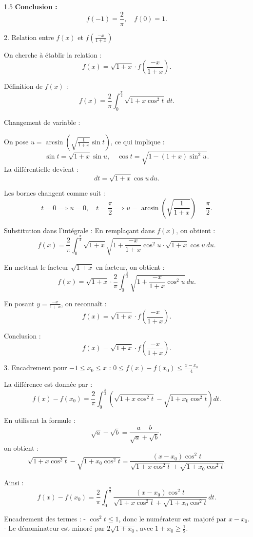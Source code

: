 \documentclass[12pt]{article}
\begin{document}
\begin{spacing}{1.5}
\textbf{ Conclusion :}
\[
f(-1) = \frac{2}{\pi}, \quad f(0) = 1.
\]

2. Relation entre $f(x)$ et $f\left(\frac{-x}{1+x}\right)$

On cherche à établir la relation :
\[
f(x) = \sqrt{1+x} \cdot f\left(\frac{-x}{1+x}\right).
\]

Définition de $f(x)$ :
\[
f(x) = \frac{2}{\pi} \int_{0}^{\frac{\pi}{2}} \sqrt{1 + x \cos^2 t} \, dt.
\]

Changement de variable :

On pose $u = \arcsin\left(\sqrt{\frac{1}{1+x}} \sin t\right)$, ce qui implique :
\[
\sin t = \sqrt{1+x} \sin u, \quad \cos t = \sqrt{1 - (1+x)\sin^2 u}.
\]
La différentielle devient :
\[
dt = \sqrt{1+x} \cos u \, du.
\]

Les bornes changent comme suit :  
\[
t = 0 \implies u = 0, \quad t = \frac{\pi}{2} \implies u = \arcsin\left(\sqrt{\frac{1}{1+x}}\right) = \frac{\pi}{2}.
\]

Substitution dans l'intégrale :
En remplaçant dans $f(x)$, on obtient :
\[
f(x) = \frac{2}{\pi} \int_{0}^{\frac{\pi}{2}} \sqrt{1+x} \sqrt{1 + \frac{-x}{1+x} \cos^2 u} \cdot \sqrt{1+x} \cos u \, du.
\]

En mettant le facteur $\sqrt{1+x}$ en facteur, on obtient :
\[
f(x) = \sqrt{1+x} \cdot \frac{2}{\pi} \int_{0}^{\frac{\pi}{2}} \sqrt{1 + \frac{-x}{1+x} \cos^2 u} \, du.
\]

En posant $y = \frac{-x}{1+x}$, on reconnaît :
\[
f(x) = \sqrt{1+x} \cdot f\left(\frac{-x}{1+x}\right).
\]

Conclusion :
\[
f(x) = \sqrt{1+x} \cdot f\left(\frac{-x}{1+x}\right).
\]

3. Encadrement pour $-1 \leq x_0 \leq x$ : $0 \leq f(x) - f(x_0) \leq \frac{x - x_0}{4}$

La différence est donnée par :
\[
f(x) - f(x_0) = \frac{2}{\pi} \int_{0}^{\frac{\pi}{2}} \left( \sqrt{1 + x \cos^2 t} - \sqrt{1 + x_0 \cos^2 t} \right) dt.
\]

En utilisant la formule :
\[
\sqrt{a} - \sqrt{b} = \frac{a - b}{\sqrt{a} + \sqrt{b}},
\]
on obtient :
\[
\sqrt{1 + x \cos^2 t} - \sqrt{1 + x_0 \cos^2 t} = \frac{(x - x_0) \cos^2 t}{\sqrt{1 + x \cos^2 t} + \sqrt{1 + x_0 \cos^2 t}}.
\]

Ainsi :
\[
f(x) - f(x_0) = \frac{2}{\pi} \int_{0}^{\frac{\pi}{2}} \frac{(x - x_0) \cos^2 t}{\sqrt{1 + x \cos^2 t} + \sqrt{1 + x_0 \cos^2 t}} \, dt.
\]

Encadrement des termes :
- \( \cos^2 t \leq 1 \), donc le numérateur est majoré par $x - x_0$.
- Le dénominateur est minoré par $2\sqrt{1+x_0}$, avec $1+x_0 \geq \frac{1}{2}$.


\end{spacing}
\end{document}
